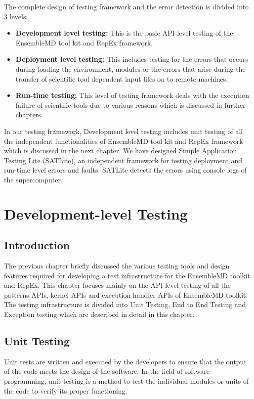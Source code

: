 \documentclass[10pt]{ruthesis}
\begin{document}
The complete design of testing framework and the error detection is divided into 3 levels:

\begin{itemize}
\item \textbf{Development level testing:} This is the basic API level testing of the EnsembleMD tool kit and RepEx framework.
\item \textbf{Deployment level testing:} This includes testing for the errors that occurs during loading the environment, modules or the errors that arise during the transfer of scientific tool dependent input files on to remote machines. 
\item \textbf{Run-time testing:} This level of testing framework deals with the execution failure of scientific tools due to various reasons which is discussed in further chapters. 
\end{itemize}

In our testing framework, Development level testing includes unit testing of all the independent functionalities of EnsembleMD tool kit and RepEx framework which is discussed in the next chapter. We have designed Simple Application Testing Lite (SATLite), an independent framework for testing deployment and run-time level errors and faults. SATLite detects the errors using console logs of the supercomputer.


\chapter{Development-level Testing}

\section{Introduction}
The previous chapter briefly discussed the various testing tools and design features required for developing a test infrastructure for the EnsembleMD toolkit and RepEx. This chapter focuses mainly on the API level testing of all the patterns APIs, kernel APIs and execution handler APIs of EnsembleMD toolkit. The testing infrastructure is divided into Unit Testing, End to End Testing and Exception testing which are described in detail in this chapter.

\section{Unit Testing}
Unit tests are written and executed by the developers to ensure that the output of the code meets the design of the software. In the field of software programming, unit testing is a method to test the individual modules or units of the code to verify its proper functioning. 
\end{document}
